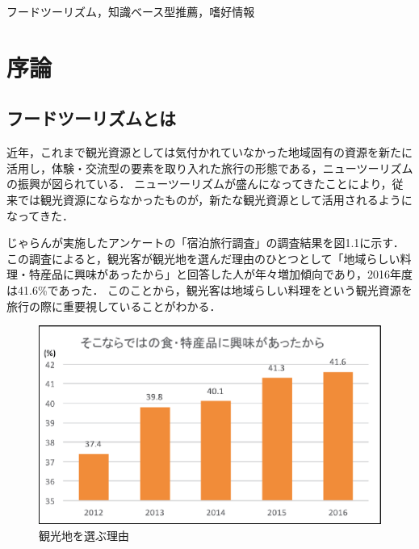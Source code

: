 \documentclass{funthesis}
\begin{document}
\begin{jkeyword}
フードツーリズム，知識ベース型推薦，嗜好情報
\end{jkeyword}

\tableofcontents %






\chapter{序論} 

\section{フードツーリズムとは}
近年，これまで観光資源としては気付かれていなかった地域固有の資源を新たに活用し，体験・交流型の要素を取り入れた旅行の形態である，ニューツーリズムの振興が図られている\cite{1}．
ニューツーリズムが盛んになってきたことにより，従来では観光資源にならなかったものが，新たな観光資源として活用されるようになってきた．

じゃらんが実施したアンケートの「宿泊旅行調査」の調査結果を図1.1に示す\cite{2}．
この調査によると，観光客が観光地を選んだ理由のひとつとして「地域らしい料理・特産品に興味があったから」と回答した人が年々増加傾向であり，2016年度は41.6\%であった．
このことから，観光客は地域らしい料理をという観光資源を旅行の際に重要視していることがわかる．

\begin{figure}[!b]
  \begin{center}
    \includegraphics[clip,width=13cm]{jaran.eps}
    \caption{観光地を選ぶ理由}
  \end{center}
\end{figure}
\end{document}
